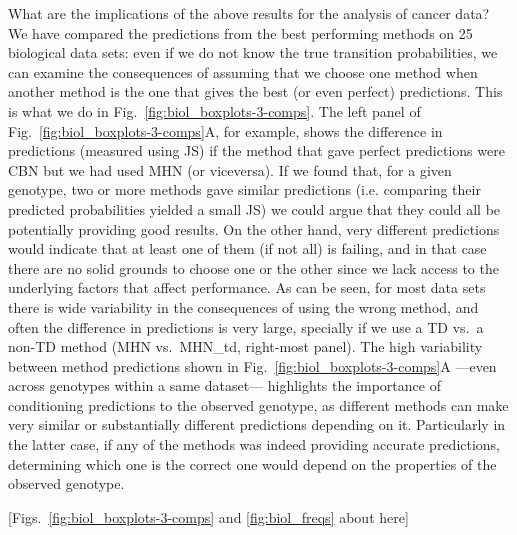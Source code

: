 \documentclass[a4paper,10pt]{article}
\newcommand{\idea}[1]{\textcolor{red}{#1}}
\begin{document}





What are the implications of the above results for the analysis of cancer
data? We have compared the predictions from the best performing methods on
25 biological data sets: even if we do not know the true transition
probabilities, we can examine the consequences of assuming that we choose
one method when another method is the one that gives the best (or even
perfect) predictions. This is what we do in
Fig.~\ref{fig:biol_boxplots-3-comps}. The left panel
of Fig.~\ref{fig:biol_boxplots-3-comps}A,
for example, shows
the difference in predictions (measured using JS) if the method that gave
perfect predictions were CBN but we had used MHN (or viceversa).  If we
found that, for a given genotype, two or more methods gave similar
predictions (i.e. comparing their predicted probabilities yielded a small
JS) we could argue that they could all be potentially providing good
results. On the other hand,
very different predictions would indicate that at least one of them
(if not all) is failing, and in that case
there are no solid grounds to choose one or the
other since we lack access to the underlying factors that affect
performance.  As can be seen, for most data sets there is wide
variability in the consequences of using the wrong method, and often the
difference in predictions is very large, specially if we use a TD vs.\ a
non-TD method (MHN vs.\ MHN\_td, right-most panel). 
The high variability between method
predictions shown in Fig.~\ref{fig:biol_boxplots-3-comps}A ---even across genotypes 
within a same dataset--- highlights the importance
of conditioning predictions to the observed genotype, as different methods can make
very similar or substantially different predictions depending on it.
Particularly in the latter case, if any of the methods was indeed providing accurate
predictions, determining which one is the correct one would depend on the properties
of the observed genotype.

[Figs.~\ref{fig:biol_boxplots-3-comps} and \ref{fig:biol_freqs} about
here]
\end{document}
